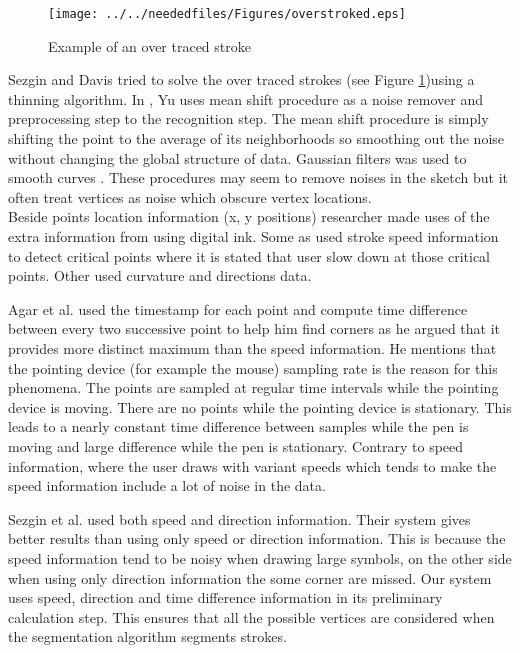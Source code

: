 \begin{figure}
	\centering
		\texttt{[image: ../../neededfiles/Figures/overstroked.eps]}
	\caption[Example of an over traced stroke]{Example of an over traced stroke \cite{overtraced24}}
	\label{fig:overstroked}
\end{figure} 

 Sezgin and Davis \cite{overtraced24} tried to solve the over traced strokes (see Figure \ref {fig:overstroked})using a thinning algorithm. In \cite{meanshift10,domainindependent17}, Yu uses mean shift procedure as a noise remover and preprocessing step to the recognition step. The mean shift procedure is simply shifting the point to the average of its neighborhoods so smoothing out the noise without changing the global structure of data. Gaussian filters was used to smooth curves \cite {Phoenix88}. These procedures may seem to remove noises in the sketch but it often treat vertices as noise which obscure vertex locations. \\
Beside points location information (x, y positions) researcher made uses of the extra information from using digital ink. Some as \cite{mulitstroke5,polygonfeedback31} used stroke speed information to detect critical points where it is stated that user slow down at those critical points. Other used curvature and directions data. %

 Agar et al. \cite{polygonfeedback31} used the timestamp for each point and compute time difference between every two successive point to help him find corners as he argued that it provides more distinct maximum than the speed information. He mentions that the pointing device (for example the mouse) sampling rate is the reason for this phenomena. The points are sampled at regular time intervals while the pointing device is moving. There are no points while the pointing device is stationary. This leads to a nearly constant time difference between samples while the pen is moving and large difference while the pen is stationary. Contrary to speed information, where the user draws with variant speeds which tends to make the speed information include a lot of noise in the data.
  
Sezgin et al.\cite{earlyprocess} used both speed and direction information. Their system gives better results than using only speed or direction information. This is because the speed information tend to be noisy when drawing large symbols, on the other side when using only direction information the some corner are missed. Our system uses speed, direction and time difference information in its preliminary calculation step. This ensures that all the possible vertices are considered when the segmentation algorithm segments strokes. %
 


